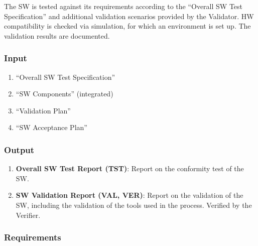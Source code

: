 \documentclass{template/openetcs_article}
\begin{document}
The SW is tested against its requirements according to the
``Overall SW Test Specification'' and additional validation scenarios
provided by the Validator. HW compatibility is checked via simulation, for which an
environment is set up. The validation results are documented.

\subsubsection{Input}
\label{sec:7-input}

\begin{enumerate}
\item ``Overall SW Test Specification''
\item ``SW Components'' (integrated)
\item ``Validation Plan''
\item ``SW Acceptance Plan''
\end{enumerate}

\subsubsection{Output}
\label{sec:7-output}

\begin{enumerate}
\item \textbf{Overall SW Test Report (TST)}: Report on the conformity
  test of the SW.
\item \textbf{SW Validation Report (VAL, VER)}: Report on the validation of
  the SW, including the validation of the tools used in the
  process. Verified by the Verifier.
\end{enumerate}

\subsubsection{Requirements}
\label{sec:7-requirements}
\end{document}
